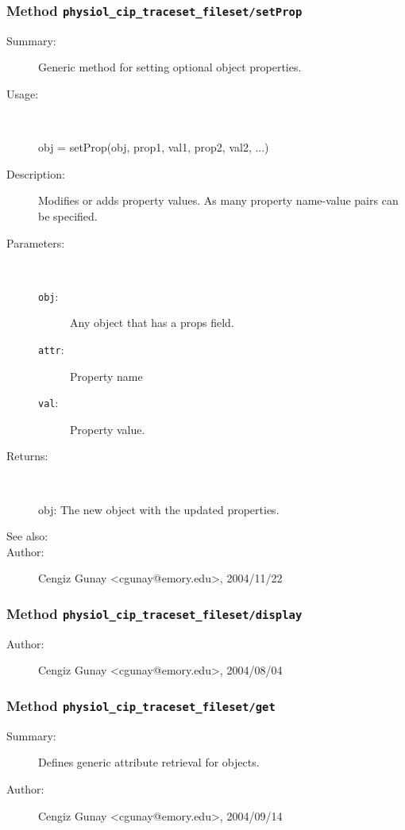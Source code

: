 \subsubsection[Method \texttt{setProp}]{Method \texttt{physiol\_cip\_traceset\_fileset/setProp}}%
%
\label{ref_physiol_cip_traceset_fileset__setProp}%
\hypertarget{ref_physiol_cip_traceset_fileset__setProp}{}%
\begin{description}
\item[Summary:]Generic method for setting optional object properties.
%
\item[Usage:]~%
\begin{lyxcode}%
obj = setProp(obj, prop1, val1, prop2, val2, ...)
%
\end{lyxcode}%
%
\item[Description:]%
Modifies or adds property values. As many property name-value 
 pairs can be specified.
\item[Parameters:]~
\begin{description}%
\item[\texttt{obj}:]
 Any object that has a props field.
\item[\texttt{attr}:]
 Property name
\item[\texttt{val}:]
 Property value.
\end{description}%
%
\item[Returns:]~

	obj: The new object with the updated properties.
%
%
\item[See also:]%
%
\item[Author:]%
Cengiz Gunay <cgunay@emory.edu>, 2004/11/22%
\end{description}
\methodline%
\subsubsection[Method \texttt{display}]{Method \texttt{physiol\_cip\_traceset\_fileset/display}}%
%
\label{ref_physiol_cip_traceset_fileset__display}%
\hypertarget{ref_physiol_cip_traceset_fileset__display}{}%
\begin{description}
%
%
%
%
%
%
%
\item[Author:]%
Cengiz Gunay <cgunay@emory.edu>, 2004/08/04%
\end{description}
\methodline%
\subsubsection[Method \texttt{get}]{Method \texttt{physiol\_cip\_traceset\_fileset/get}}%
%
\label{ref_physiol_cip_traceset_fileset__get}%
\hypertarget{ref_physiol_cip_traceset_fileset__get}{}%
\begin{description}
\item[Summary:]Defines generic attribute retrieval for objects.
%
%
%
%
%
%
%
\item[Author:]%
Cengiz Gunay <cgunay@emory.edu>, 2004/09/14%
\end{description}
\methodline%
